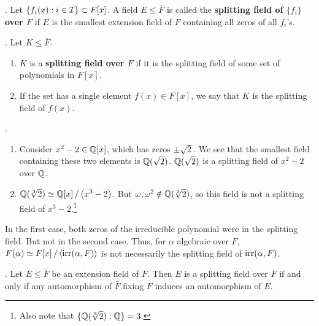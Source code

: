 
.  Let \(\{f_i(x) : i \in \mathcal{I}\} \subset F[x]\). A field \(E \leq \bar{F}\) is called the \textbf{splitting field of \(\{f_i\}\) over \(F\)} if \(E\) is the smallest extension field of \(F\) containing all zeros of all \(f_i\)'s.

. Let \(K \leq \bar{F}\).
\begin{enumerate}
    \item \(K\) is a \textbf{splitting field over \(F\)} if it is the splitting field of some set of polynomials in \(F[x]\).
    \item If the set has a single element \(f(x) \in F[x]\), we say that \(K\) is the splitting field of \(f(x)\).
\end{enumerate}

\ex.
\begin{enumerate}
    \item Consider \(x^2 -2 \in \mathbb{Q}[x]\), which has zeros \(\pm \sqrt{2}\). We see that the smallest field containing these two elements is \(\mathbb{Q}(\sqrt{2})\). \(\mathbb{Q}(\sqrt{2})\) is a splitting field of \(x^2 - 2\) over \(\mathbb{Q}\).

    \item \(\mathbb{Q}(\sqrt[3]{2}) \simeq \mathbb{Q}[x] \operatorname{/} \left\langle x^3 - 2 \right\rangle\). But \(\omega, \omega^2 \notin \mathbb{Q}(\sqrt[3]{2})\), so this field is not a splitting field of \(x^3 - 2\).\footnote{Also note that \(\{\mathbb{Q}(\sqrt[3]{2}) : \mathbb{Q}\} = 3\).}
\end{enumerate}

In the first case, both zeros of the irreducible polynomial were in the splitting field. But not in the second case. Thus, for \(\alpha\) algebraic over \(F\), \(F(\alpha) \simeq F[x] \operatorname{/} \left\langle \mathrm{irr}(\alpha, F) \right\rangle\) is not necessarily the splitting field of \(\mathrm{irr}(\alpha, F)\).

\thm. Let \(E \leq \bar{F}\) be an extension field of \(F\). Then \(E\) is a splitting field over \(F\) if and only if any automorphism of \(\bar{F}\) fixing \(F\) induces an automorphism of \(E\).

